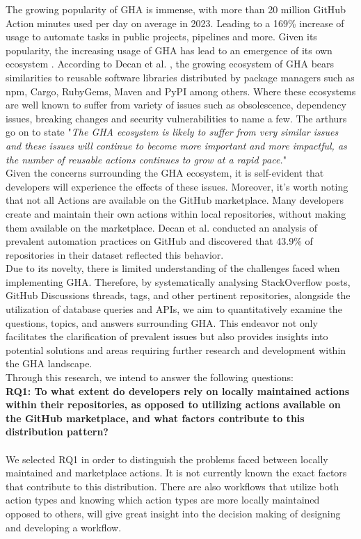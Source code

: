 \documentclass[conference]{IEEEtran}
\begin{document}
    The growing popularity of GHA is immense, with more than 20 million GitHub Action minutes used per day on average in 2023. Leading to a 169\% increase of usage to automate tasks in public projects,  pipelines and more\cite{b3}. Given its popularity,  the increasing usage of GHA has lead to an emergence of its own ecosystem \cite{b4}.  According to Decan et al. \cite{b4}, the growing ecosystem of GHA bears similarities to reusable software libraries distributed by package managers such as npm, Cargo, RubyGems, Maven and PyPI among others. Where these ecosystems are well known to suffer from variety of issues such as obsolescence, dependency issues, breaking changes and security vulnerabilities to name a few\cite{b4}. The arthurs go on to state "\textit{The GHA ecosystem is likely to suffer from very similar issues and these issues will continue to become more important and more impactful, as the number of reusable actions continues to grow at a rapid pace.}"\\

    Given the concerns surrounding the GHA ecosystem, it is self-evident that developers will experience the effects of these issues.  Moreover, it's worth noting that not all Actions are available on the GitHub marketplace. Many developers create and maintain their own actions within local repositories, without making them available on the marketplace. Decan et al. \cite{b4} conducted an analysis of prevalent automation practices on GitHub and discovered that 43.9\% of repositories in their dataset reflected this behavior.\\

    Due to its novelty, there is limited understanding of the challenges faced when implementing GHA.  
Therefore,  by systematically analysing StackOverflow posts, GitHub Discussions threads, tags, and other pertinent repositories, alongside the utilization of database queries and APIs, we aim to quantitatively examine the questions, topics, and answers surrounding GHA. This endeavor not only facilitates the clarification of prevalent issues but also provides insights into potential solutions and areas requiring further research and development within the GHA landscape.\\

Through this research, we intend to answer the following questions:
\\


     \textbf{RQ1: To what extent do developers rely on locally maintained actions within their repositories, as opposed to utilizing actions available on the GitHub marketplace, and what factors contribute to this distribution pattern?}
\\
\\
We selected RQ1 in order to distinguish the problems faced between locally maintained and marketplace actions. It is not currently known the exact factors that contribute to this distribution. There are also workflows that utilize both action types and knowing which action types are more locally maintained opposed to others, will give great insight into the decision making of designing and developing a workflow. \\
\end{document}
